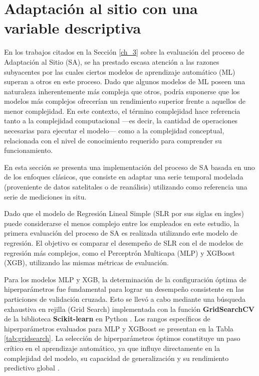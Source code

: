 \documentclass[letterpaper,12pt, twoside]{report}
\providecommand{\DIFdeltex}[1]{{\protect\color{red} \scriptsize #1}} %
\providecommand{\DIFdel}[1]{\texorpdfstring{\DIFdeltex{#1}}{}} %
\begin{document}
\section{\DIFdel{Adaptación al sitio con una variable descriptiva}}%
\addtocounter{section}{-1}%

\DIFdel{En los trabajos citados en la Sección \ref{ch_3} sobre la evaluación del proceso de Adaptación al Sitio (SA), se ha prestado escasa atención a las razones subyacentes por las cuales ciertos modelos de aprendizaje automático (ML) superan a otros en este proceso. Dado que algunos modelos de ML poseen una naturaleza inherentemente más compleja que otros, podría suponerse que los modelos más complejos ofrecerían un rendimiento superior frente a aquellos de menor complejidad. En este contexto, el término complejidad hace referencia tanto a la complejidad computacional —es decir, la cantidad de operaciones necesarias para ejecutar el modelo— como a la complejidad conceptual, relacionada con el nivel de conocimiento requerido para comprender su funcionamiento.}%

\DIFdel{En esta sección se presenta una implementación del proceso de SA basada en uno de los enfoques clásicos, que consiste en adaptar una serie temporal modelada (proveniente de datos satelitales o de reanálisis) utilizando como referencia una serie de mediciones in situ.}%

\DIFdel{Dado que el modelo de Regresión Lineal Simple (SLR por sus siglas en ingles) puede considerarse el menos complejo entre los empleados en este estudio, la primera evaluación del proceso de SA es realizada utilizando este modelo de regresión. El objetivo es comparar el desempeño de SLR con el de modelos de regresión más complejos, como el Perceptrón Multicapa (MLP) y XGBoost (XGB), utilizando las mismas métricas de evaluación.}%

\DIFdel{Para los modelos MLP y XGB, la determinación de la configuración óptima de hiperparámetros fue fundamental para lograr un desempeño consistente en las particiones de validación cruzada. Esto se llevó a cabo mediante una búsqueda exhaustiva en rejilla (Grid Search) implementada con la función \textbf{GridSearchCV} de la biblioteca \textbf{Scikit-learn} en Python \citep{Pedregosa2012}. Los rangos específicos de hiperparámetros evaluados para MLP y XGBoost se presentan en la Tabla \ref{tab:gridsearch}. La selección de hiperparámetros óptimos constituye un paso crítico en el aprendizaje automático, ya que influye directamente en la complejidad del modelo, su capacidad de generalización y su rendimiento predictivo global \citep{Goodfellow2016}.}%
\end{document}
